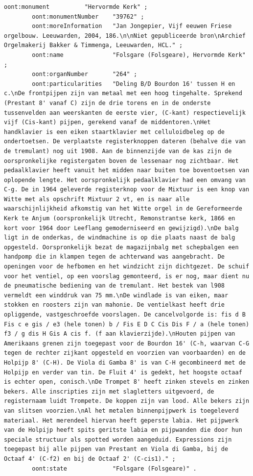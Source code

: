 \begin{lstlisting}[caption={Part14\_000Folsgare}]
        oont:monument          "Hervormde Kerk" ;
        oont:monumentNumber    "39762" ;
        oont:moreInformation   "Jan Jongepier, Vijf eeuwen Friese orgelbouw. Leeuwarden, 2004, 186.\n\nNiet gepubliceerde bron\nArchief Orgelmakerij Bakker & Timmenga, Leeuwarden, HCL." ;
        oont:name              "Folsgare (Folsgeare), Hervormde Kerk" ;
        oont:organNumber       "264" ;
        oont:particularities   "Deling B/D Bourdon 16' tussen H en c.\nDe frontpijpen zijn van metaal met een hoog tingehalte. Sprekend (Prestant 8' vanaf C) zijn de drie torens en in de onderste tussenvelden aan weerskanten de eerste vier, (C-kant) respectievelijk vijf (Cis-kant) pijpen, gerekend vanaf de middentoren.\nHet handklavier is een eiken staartklavier met celluloidbeleg op de ondertoetsen. De verplaatste registerknoppen dateren (behalve die van de tremulant) nog uit 1908. Aan de binnenzijde van de kas zijn de oorspronkelijke registergaten boven de lessenaar nog zichtbaar. Het pedaalklavier heeft vanuit het midden naar buiten toe boventoetsen van oplopende lengte. Het oorspronkelijk pedaalklavier had een omvang van C-g. De in 1964 geleverde registerknop voor de Mixtuur is een knop van Witte met als opschrift Mixtuur 2 vt, en is naar alle waarschijnlijkheid afkomstig van het Witte orgel in de Gereformeerde Kerk te Anjum (oorspronkelijk Utrecht, Remonstrantse kerk, 1866 en kort voor 1964 door Leeflang gemoderniseerd en gewijzigd).\nDe balg ligt in de onderkas, de windmachine is op die plaats naast de balg opgesteld. Oorspronkelijk bezat de magazijnbalg met schepbalgen een handpomp die in klampen tegen de achterwand was aangebracht. De openingen voor de hefbomen en het windzicht zijn dichtgezet. De schuif voor het ventiel, op een voorslag gemonteerd, is er nog, maar dient nu de pneumatische bediening van de tremulant. Het bestek van l908 vermeldt een winddruk van 75 mm.\nDe windlade is van eiken, maar stokken en roosters zijn van mahonie. De ventielkast heeft drie opliggende, vastgeschroefde voorslagen. De cancelvolgorde is: fis d B Fis c e gis / e3 (hele tonen) b / Fis E D C Cis Dis F / a (hele tonen) f3 / g dis H Gis A cis f. (f aan klavierzijde).\nHouten pijpen van Amerikaans grenen zijn toegepast voor de Bourdon 16' (C-h, waarvan C-G tegen de rechter zijkant opgesteld en voorzien van voorbaarden) en de Holpijp 8' (C-H). De Viola di Gamba 8' is van C-H gecombineerd met de Holpijp en verder van tin. De Fluit 4' is gedekt, het hoogste octaaf is echter open, conisch.\nDe Trompet 8' heeft zinken stevels en zinken bekers. Alle inscripties zijn met slagletters uitgevoerd, de registernaam luidt Trompete. De koppen zijn van lood. Alle bekers zijn van slitsen voorzien.\nAl het metalen binnenpijpwerk is toegeleverd materiaal. Het merendeel hiervan heeft geperste labia. Het pijpwerk van de Holpijp heeft spits geritste labia en pijpwanden die door hun speciale structuur als spotted worden aangeduid. Expressions zijn toegepast bij alle pijpen van Prestant en Viola di Gamba, bij de Octaaf 4' (C-f2) en bij de Octaaf 2' (C-cis1)." ;
        oont:state             "Folsgare (Folsgeare)" .


\end{lstlisting}

